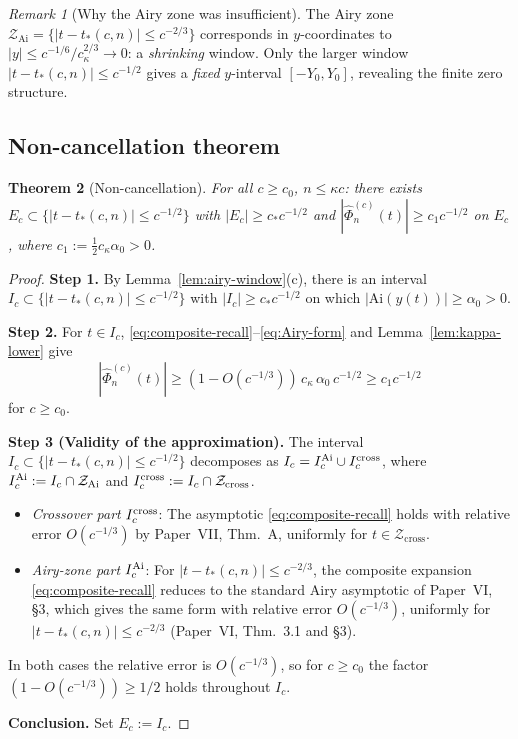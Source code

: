 \documentclass[12pt,a4paper]{amsart}
\newtheorem{theorem}{Theorem}[section]
\theoremstyle{definition}
\theoremstyle{remark}
\newtheorem{remark}[theorem]{Remark}
\newcommand{\Phihat}{\widehat{\Phi}}
\newcommand{\Ai}{\mathrm{Ai}}
\newcommand{\Zcross}{\mathcal{Z}_{\mathrm{cross}}}
\newcommand{\Zai}{\mathcal{Z}_{\mathrm{Ai}}}
\newcommand{\tstar}{t_*(c,n)}
\begin{document}
\begin{remark}[Why the Airy zone was insufficient]
\label{rem:c16-explained}
The Airy zone $\Zai=\{|t-\tstar|\le c^{-2/3}\}$
corresponds in $y$-coordinates to
$|y|\le c^{-1/6}/c_\kappa^{2/3}\to 0$:
a \emph{shrinking} window.
Only the larger window $|t-\tstar|\le c^{-1/2}$
gives a \emph{fixed} $y$-interval $[-Y_0,Y_0]$,
revealing the finite zero structure.
\end{remark}

\subsection{Non-cancellation theorem}
\label{sec:nonvanish}

\begin{theorem}[Non-cancellation]
\label{thm:nonvanish}
For all $c\ge c_0$, $n\le\kappa c$:
there exists $E_c\subset\{|t-\tstar|\le c^{-1/2}\}$
with $|E_c|\ge c_*c^{-1/2}$ and
$|\Phihat_n^{(c)}(t)|\ge c_1 c^{-1/2}$ on $E_c$,
where $c_1:=\frac{1}{2}c_\kappa\alpha_0>0$.
\end{theorem}

\begin{proof}
\textbf{Step 1.}
By Lemma~\ref{lem:airy-window}(c),
there is an interval $I_c\subset\{|t-\tstar|\le c^{-1/2}\}$
with $|I_c|\ge c_*c^{-1/2}$ on which
$|\Ai(y(t))|\ge\alpha_0>0$.

\textbf{Step 2.}
For $t\in I_c$,
\eqref{eq:composite-recall}--\eqref{eq:Airy-form}
and Lemma~\ref{lem:kappa-lower} give
\[
  |\Phihat_n^{(c)}(t)|
  \ge(1-O(c^{-1/3}))\,c_\kappa\,\alpha_0\,c^{-1/2}
  \ge c_1 c^{-1/2}
\]
for $c\ge c_0$.

\textbf{Step 3 (Validity of the approximation).}
The interval $I_c \subset \{|t-\tstar|\le c^{-1/2}\}$
decomposes as $I_c = I_c^{\rm Ai} \cup I_c^{\rm cross}$,
where $I_c^{\rm Ai} := I_c \cap \Zai$
and $I_c^{\rm cross} := I_c \cap \Zcross$.

\begin{itemize}
\item \emph{Crossover part} $I_c^{\rm cross}$:
The asymptotic \eqref{eq:composite-recall} holds
with relative error $O(c^{-1/3})$ by
Paper~VII, Thm.~A, uniformly for $t\in\Zcross$.
\item \emph{Airy-zone part} $I_c^{\rm Ai}$:
For $|t-\tstar|\le c^{-2/3}$, the composite
expansion \eqref{eq:composite-recall} reduces to
the standard Airy asymptotic of Paper~VI, \S3,
which gives the same form with relative error
$O(c^{-1/3})$, uniformly for $|t-\tstar|\le c^{-2/3}$
(Paper~VI, Thm.~3.1 and \S3).
\end{itemize}

In both cases the relative error is $O(c^{-1/3})$,
so for $c\ge c_0$ the factor $(1-O(c^{-1/3}))\ge 1/2$
holds throughout $I_c$.

\textbf{Conclusion.}
Set $E_c:=I_c$.
\end{proof}
\end{document}
